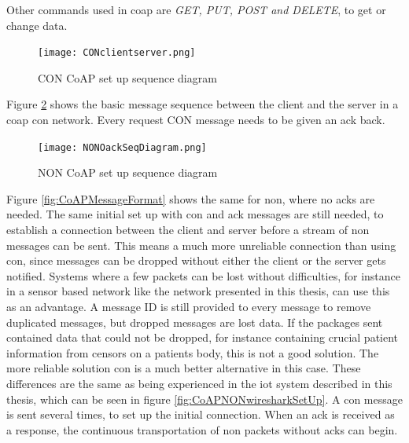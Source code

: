 Other commands used in \gls{coap} are \textit{GET, PUT, POST and DELETE}, to get or change data. 



\begin{figure}[ht]
    \centering
    \texttt{[image: CONclientserver.png]}    
    \caption{CON CoAP set up sequence diagram}
    \label{fig:CONclientserver}
\end{figure}

Figure \ref{fig:NONOackSeqDiagram} shows the basic message sequence between the client and the server in a \gls{coap} \gls{con} network. Every request CON message needs to be given an ack back. 

\begin{figure}[ht]
    \centering
    \texttt{[image: NONOackSeqDiagram.png]}    
    \caption{NON CoAP set up sequence diagram}
    \label{fig:NONOackSeqDiagram}
\end{figure}

Figure \ref{fig:CoAPMessageFormat} shows the same for \gls{non}, where no \glspl{ack} are needed. The same initial set up with con and ack messages are still needed, to establish a connection between the client and server before a stream of \gls{non} messages can be sent. This means a much more unreliable connection than using \gls{con}, since messages can be dropped without either the client or the server gets notified. Systems where a few packets can be lost without difficulties, for instance in a sensor based network like the network presented in this thesis, can use this as an advantage. A message ID is still provided to every message to remove duplicated messages, but dropped messages are lost data. If the packages sent contained data that could not be dropped, for instance containing crucial patient information from censors on a patients body, this is not a good solution. The more reliable solution \gls{con} is a much better alternative in this case. These differences are the same as being experienced in the \gls{iot} system described in this thesis, which can be seen in figure \ref{fig:CoAPNONwiresharkSetUp}. A \gls{con} message is sent several times, to set up the initial connection. When an \gls{ack} is received as a response, the continuous transportation of \gls{non} packets without \glspl{ack} can begin. 

